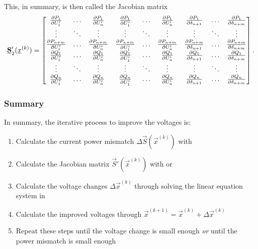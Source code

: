 This, in summary, is then called the Jacobian matrix
\begin{equation}
	\mat S_2' (\vec x^{(k)}) = 
	\begin{bmatrix}
		\frac{\partial P_1}{\partial U_1^r}	& \hdots & \frac{\partial P_1}{\partial U_n^r} & \frac{\partial P_1}{\partial U_1^i} & \hdots & \frac{\partial P_1}{\partial U_n^i}	& \frac{\partial P_1}{\partial \delta_{n + 1}} & \hdots & \frac{\partial P_1}{\partial \delta_{n + m}} \\
		\vdots & \ddots	& \vdots & \vdots & \ddots & \vdots & \vdots & \ddots & \vdots \\
		\frac{\partial P_{n + m}}{\partial U_1^r} & \hdots & \frac{\partial P_{n + m}}{\partial U_n^r} & \frac{\partial P_{n + m}}{\partial U_1^i} & \hdots & \frac{\partial P_{n + m}}{\partial U_n^i} & \frac{\partial P_{n + m}}{\partial \delta_{n + 1}} & \hdots & \frac{\partial P_{n + m}}{\partial \delta_{n + m}} \\
		\frac{\partial Q_1}{\partial U_1^r}	& \hdots & \frac{\partial Q_1}{\partial U_n^r} & \frac{\partial Q_1}{\partial U_1^i} & \hdots & \frac{\partial Q_1}{\partial U_n^i}	& \frac{\partial Q_1}{\partial \delta_{n + 1}} & \hdots & \frac{\partial Q_1}{\partial \delta_{n + m}} \\
		\vdots & \ddots	& \vdots & \vdots & \ddots & \vdots & \vdots & \ddots & \vdots \\
		\frac{\partial Q_n}{\partial U_1^r} & \hdots & \frac{\partial Q_n}{\partial U_n^r} & \frac{\partial Q_n}{\partial U_1^i} & \hdots & \frac{\partial Q_n}{\partial U_n^i} & \frac{\partial Q_n}{\partial \delta_{n + 1}} & \hdots & \frac{\partial Q_n}{\partial \delta_{n + m}} \\
	\end{bmatrix}.
	\label{eq:power_jacobian_newton_rapshon_2}
\end{equation}

\subsubsection{Summary}
In summary, the iterative process to improve the voltages is:
\begin{enumerate}
	\item Calculate the current power mismatch $\Delta \vec S (\vec x^{(k)})$ with 
	\item Calculate the Jacobian matrix $\vec S' (\vec x^{(k)})$ with  or 
	\item Calculate the voltage changes $\Delta \vec x^{(k)}$ through solving the linear equation system in 
	\item Calculate the improved voltages through $\vec x^{(k+1)} = \vec x^{(k)} + \Delta \vec x^{(k)}$
	\item Repeat these steps until the voltage change is small enough \emph{or} until the power mismatch is small enough
\end{enumerate}

